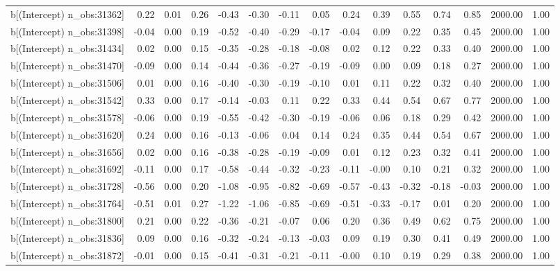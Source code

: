 \begin{table}[ht]
\begin{tabular}{rrrrrrrrrrrrrrr}
  b[(Intercept) n\_obs:31362] & 0.22 & 0.01 & 0.26 & -0.43 & -0.30 & -0.11 & 0.05 & 0.24 & 0.39 & 0.55 & 0.74 & 0.85 & 2000.00 & 1.00 \\ 
  b[(Intercept) n\_obs:31398] & -0.04 & 0.00 & 0.19 & -0.52 & -0.40 & -0.29 & -0.17 & -0.04 & 0.09 & 0.22 & 0.35 & 0.45 & 2000.00 & 1.00 \\ 
  b[(Intercept) n\_obs:31434] & 0.02 & 0.00 & 0.15 & -0.35 & -0.28 & -0.18 & -0.08 & 0.02 & 0.12 & 0.22 & 0.33 & 0.40 & 2000.00 & 1.00 \\ 
  b[(Intercept) n\_obs:31470] & -0.09 & 0.00 & 0.14 & -0.44 & -0.36 & -0.27 & -0.19 & -0.09 & 0.00 & 0.09 & 0.18 & 0.27 & 2000.00 & 1.00 \\ 
  b[(Intercept) n\_obs:31506] & 0.01 & 0.00 & 0.16 & -0.40 & -0.30 & -0.19 & -0.10 & 0.01 & 0.11 & 0.22 & 0.32 & 0.40 & 2000.00 & 1.00 \\ 
  b[(Intercept) n\_obs:31542] & 0.33 & 0.00 & 0.17 & -0.14 & -0.03 & 0.11 & 0.22 & 0.33 & 0.44 & 0.54 & 0.67 & 0.77 & 2000.00 & 1.00 \\ 
  b[(Intercept) n\_obs:31578] & -0.06 & 0.00 & 0.19 & -0.55 & -0.42 & -0.30 & -0.19 & -0.06 & 0.06 & 0.18 & 0.29 & 0.42 & 2000.00 & 1.00 \\ 
  b[(Intercept) n\_obs:31620] & 0.24 & 0.00 & 0.16 & -0.13 & -0.06 & 0.04 & 0.14 & 0.24 & 0.35 & 0.44 & 0.54 & 0.67 & 2000.00 & 1.00 \\ 
  b[(Intercept) n\_obs:31656] & 0.02 & 0.00 & 0.16 & -0.38 & -0.28 & -0.19 & -0.09 & 0.01 & 0.12 & 0.23 & 0.32 & 0.41 & 2000.00 & 1.00 \\ 
  b[(Intercept) n\_obs:31692] & -0.11 & 0.00 & 0.17 & -0.58 & -0.44 & -0.32 & -0.23 & -0.11 & -0.00 & 0.10 & 0.21 & 0.32 & 2000.00 & 1.00 \\ 
  b[(Intercept) n\_obs:31728] & -0.56 & 0.00 & 0.20 & -1.08 & -0.95 & -0.82 & -0.69 & -0.57 & -0.43 & -0.32 & -0.18 & -0.03 & 2000.00 & 1.00 \\ 
  b[(Intercept) n\_obs:31764] & -0.51 & 0.01 & 0.27 & -1.22 & -1.06 & -0.85 & -0.69 & -0.51 & -0.33 & -0.17 & 0.01 & 0.20 & 2000.00 & 1.00 \\ 
  b[(Intercept) n\_obs:31800] & 0.21 & 0.00 & 0.22 & -0.36 & -0.21 & -0.07 & 0.06 & 0.20 & 0.36 & 0.49 & 0.62 & 0.75 & 2000.00 & 1.00 \\ 
  b[(Intercept) n\_obs:31836] & 0.09 & 0.00 & 0.16 & -0.32 & -0.24 & -0.13 & -0.03 & 0.09 & 0.19 & 0.30 & 0.41 & 0.49 & 2000.00 & 1.00 \\ 
  b[(Intercept) n\_obs:31872] & -0.01 & 0.00 & 0.15 & -0.41 & -0.31 & -0.21 & -0.11 & -0.00 & 0.10 & 0.19 & 0.29 & 0.38 & 2000.00 & 1.00 \\ 

\end{tabular}
\end{table}
